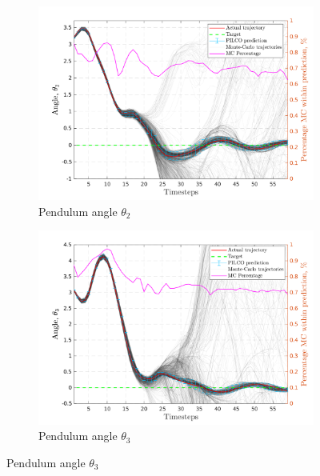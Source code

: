\begin{figure}[htp!]
  \vspace{4ex}  %
  \begin{subfigure}[b]{0.48\linewidth}
    \centering
    \includegraphics[height=0.22\textheight,width=1\textwidth]{Chapter3/Figures/pen_MC_rollout_Ep_40_Dim_3.png} 
    \caption{Pendulum angle $\theta_2$} 
    \label{Fig:Re-pen-pen-velocity} 
  \end{subfigure} 
  \hspace{\fill}
  \begin{subfigure}[b]{0.48\linewidth}
    \centering
    \includegraphics[height=0.22\textheight,width=1\textwidth]{Chapter3/Figures/pen_MC_rollout_Ep_40_Dim_4.png} 
    \caption{Pendulum angle $\theta_3$} 
    \label{Fig:Re-pen-pen-angle} 
  \end{subfigure} 


\end{figure}
